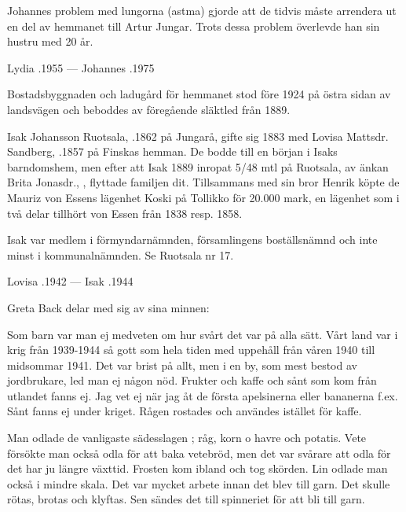 Johannes problem med lungorna (astma) gjorde att de tidvis måste arrendera ut en del av hemmanet till Artur Jungar. Trots dessa problem överlevde han sin hustru med 20 år.
\begin{jhchildren}
  \item {}
  \item {}
\end{jhchildren}

Lydia .1955  ---  Johannes .1975



Bostadsbyggnaden och ladugård för hemmanet stod före 1924 på östra sidan av landsvägen och beboddes av föregående släktled från 1889.\jhvspace{}


Isak Johansson Ruotsala, .1862 på Jungarå,  gifte sig 1883 med Lovisa Mattsdr. Sandberg, .1857 på Finskas hemman. De bodde till en början i Isaks barndomshem, men efter att Isak 1889 inropat 5/48 mtl på Ruotsala, av änkan Brita Jonasdr., , flyttade familjen dit. Tillsammans med sin bror Henrik köpte de Mauriz von Essens lägenhet Koski på Tollikko för 20.000 mark, en lägenhet som i två delar tillhört von Essen från 1838 resp. 1858.

Isak var medlem i förmyndarnämnden, församlingens boställsnämnd och inte minst i kommunalnämnden. Se Ruotsala nr 17.

Lovisa .1942  ---  Isak .1944


Greta Back delar med sig av sina minnen:


Som barn var man ej medveten om hur svårt det var på alla sätt. Vårt land var i krig från 1939-1944 så gott som hela tiden med uppehåll från våren 1940 till midsommar 1941. Det var brist på allt, men i en by, som mest bestod av jordbrukare, led man ej någon nöd. Frukter och kaffe och sånt som kom från utlandet fanns ej. Jag vet ej när jag åt de första apelsinerna eller bananerna f.ex. Sånt fanns ej under kriget. Rågen rostades och användes istället för kaffe.

Man odlade de vanligaste sädesslagen ; råg, korn o havre och potatis. Vete försökte man också odla för att baka vetebröd, men det var svårare att odla för det har ju längre växttid. Frosten kom ibland och tog skörden. Lin odlade man också i mindre skala. Det var mycket arbete innan det blev till garn. Det skulle rötas, brotas och klyftas. Sen sändes det till spinneriet för att bli till garn.

